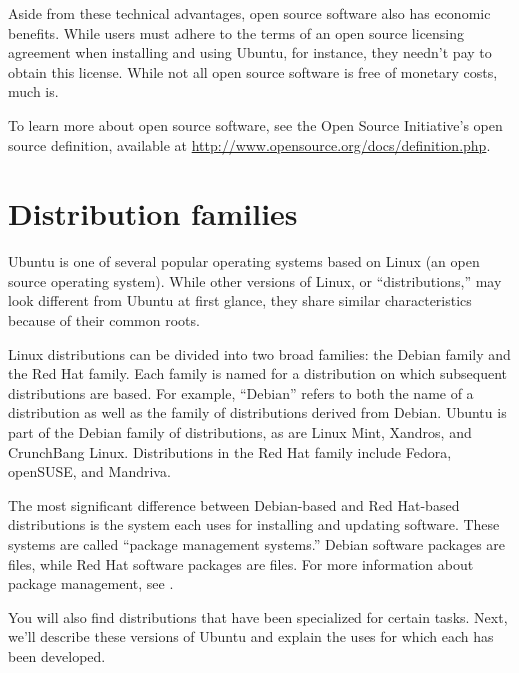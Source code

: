 Aside from these technical advantages, open source software also has economic benefits. While users must adhere to the terms of an open source licensing agreement when installing and using Ubuntu, for instance, they needn't pay to obtain this license.  While not all open source software is free of monetary costs, much is.

To learn more about open source software, see the Open Source Initiative's open source definition, available at \url{http://www.opensource.org/docs/definition.php}.

\section{Distribution families}

Ubuntu is one of several popular operating systems based on Linux (an open source operating system). While other versions of Linux, or ``distributions,'' may look different from Ubuntu at first glance, they share similar characteristics because of their common roots.

Linux distributions can be divided into two broad families: the Debian family and the Red Hat family.  Each family is named for a distribution on which subsequent distributions are based. For example, ``Debian'' refers to both the name of a distribution as well as the family of distributions derived from Debian. Ubuntu is part of the Debian family of distributions, as are Linux Mint, Xandros, and CrunchBang Linux. Distributions in the Red Hat family include Fedora, openSUSE, and Mandriva.

The most significant difference between Debian-based and Red Hat-based distributions is the system each uses for installing and updating software. These systems are called ``package management systems.'' Debian software packages are  files, while Red Hat software packages are  files. For more information about package management, see .

You will also find distributions that have been specialized for certain tasks. Next, we'll describe these versions of Ubuntu and explain the uses for which each has been developed.

